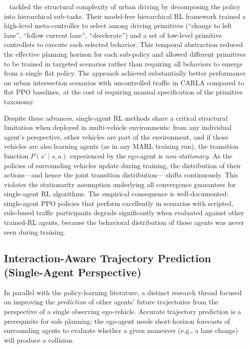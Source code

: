 \documentclass[12pt, a4paper]{article}
\begin{document}
\citeauthor{chen2019model}~\cite{chen2019model} tackled the structural
complexity of urban driving by decomposing the policy into hierarchical
sub-tasks.  Their model-free hierarchical RL framework trained a high-level
meta-controller to select among driving primitives (``change to left lane'',
``follow current lane'', ``decelerate'') and a set of low-level primitive
controllers to execute each selected behavior.  This temporal abstraction
reduced the effective planning horizon for each sub-policy and allowed
different primitives to be trained in targeted scenarios rather than requiring
all behaviors to emerge from a single flat policy.  The approach achieved
substantially better performance on urban intersection scenarios with
uncontrolled traffic in CARLA compared to flat PPO baselines, at the cost of
requiring manual specification of the primitive taxonomy.

Despite these advances, single-agent RL methods share a critical structural
limitation when deployed in multi-vehicle environments: from any individual
agent's perspective, other vehicles are part of the environment, and if those
vehicles are also learning agents (as in any MARL training run), the transition
function $P(s' \mid s, a)$ experienced by the ego-agent is \emph{non-stationary}.
As the policies of surrounding vehicles update during training, the
distribution of their actions---and hence the joint transition distribution---
shifts continuously.  This violates the stationarity assumption underlying
all convergence guarantees for single-agent RL algorithms.  The empirical
consequence is well-documented: single-agent PPO policies that perform
excellently in scenarios with scripted, rule-based traffic participants
degrade significantly when evaluated against other trained-RL agents, because
the behavioral distribution of those agents was never seen during training.

\subsection{Interaction-Aware Trajectory Prediction (Single-Agent Perspective)}
\label{sec:prediction_single}

In parallel with the policy-learning literature, a distinct research thread
focused on improving the \emph{prediction} of other agents' future trajectories
from the perspective of a single observing ego-vehicle.  Accurate trajectory
prediction is a prerequisite for safe planning: the ego-agent needs short-horizon
forecasts of surrounding agents to evaluate whether a given maneuver (e.g.,
a lane change) will produce a collision.
\end{document}
